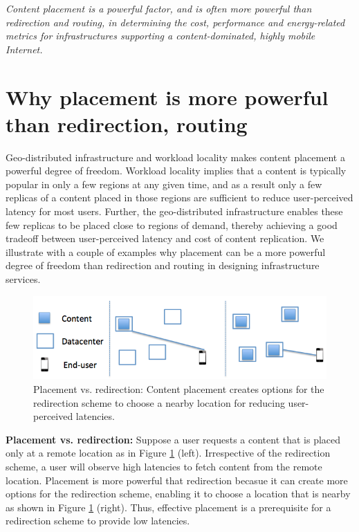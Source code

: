 \emph{Content placement is a powerful factor, and is often more powerful than redirection and routing, in determining the cost, performance and energy-related metrics for infrastructures supporting a content-dominated, highly mobile Internet.}



\section{Why placement is more powerful than redirection, routing}

Geo-distributed infrastructure and workload locality makes content placement a powerful degree of freedom. Workload locality implies that a content is typically popular in only a few regions at any given time, and as a result only a few replicas of a content placed in those regions  are sufficient to reduce user-perceived latency for most users. Further, the geo-distributed infrastructure enables these few replicas to be placed close to regions of demand, thereby achieving a good tradeoff between user-perceived latency and cost of content replication. We illustrate with a couple of examples why placement can be a more powerful degree of freedom than redirection and routing in designing infrastructure services.


\begin{figure}
	\centering
	\includegraphics[scale=0.5]{fig/placement-vs-redirection.png}
	\caption{Placement vs. redirection: Content placement creates options for the redirection scheme to choose a nearby location for reducing user-perceived latencies.}	
	\label{fig:placement-redirection}
\end{figure}


\textbf{Placement vs. redirection:} Suppose a user requests a content that is placed only at a remote location as in Figure \ref{fig:placement-redirection} (left). Irrespective of the redirection scheme, a user will observe high latencies to fetch content from the remote location. Placement is more powerful that redirection becasue it can create more options for the redirection scheme, enabling it to choose a location that is nearby as shown in Figure \ref{fig:placement-redirection} (right). Thus, effective placement is a prerequisite for a redirection scheme to provide low latencies.


